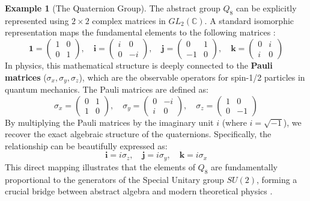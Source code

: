\documentclass[11pt]{article}
\theoremstyle{definition}
\newtheorem{example}{Example}[section]
\theoremstyle{plain}
\theoremstyle{remark}
\begin{document}
\begin{example}[The Quaternion Group]
The abstract group $Q_8$ can be explicitly represented using $2 \times 2$ complex matrices in $GL_2(\mathbb{C})$. A standard isomorphic representation maps the fundamental elements to the following matrices \cite{gallian}:
\begin{equation}
    \mathbf{1} = \begin{pmatrix} 1 & 0 \\ 0 & 1 \end{pmatrix}, \quad 
    \mathbf{i} = \begin{pmatrix} i & 0 \\ 0 & -i \end{pmatrix}, \quad 
    \mathbf{j} = \begin{pmatrix} 0 & 1 \\ -1 & 0 \end{pmatrix}, \quad 
    \mathbf{k} = \begin{pmatrix} 0 & i \\ i & 0 \end{pmatrix}
\end{equation}
In physics, this mathematical structure is deeply connected to the \textbf{Pauli matrices} ($\sigma_x, \sigma_y, \sigma_z$), which are the observable operators for spin-1/2 particles in quantum mechanics. The Pauli matrices are defined as:
\begin{equation}
    \sigma_x = \begin{pmatrix} 0 & 1 \\ 1 & 0 \end{pmatrix}, \quad 
    \sigma_y = \begin{pmatrix} 0 & -i \\ i & 0 \end{pmatrix}, \quad 
    \sigma_z = \begin{pmatrix} 1 & 0 \\ 0 & -1 \end{pmatrix}
\end{equation}
By multiplying the Pauli matrices by the imaginary unit $i$ (where $i = \sqrt{-1}$), we recover the exact algebraic structure of the quaternions. Specifically, the relationship can be beautifully expressed as:
\begin{equation}
    \mathbf{i} = i\sigma_z, \quad \mathbf{j} = i\sigma_y, \quad \mathbf{k} = i\sigma_x
\end{equation}
This direct mapping illustrates that the elements of $Q_8$ are fundamentally proportional to the generators of the Special Unitary group $SU(2)$, forming a crucial bridge between abstract algebra and modern theoretical physics \cite{dummit}.
\end{example}
\end{document}

